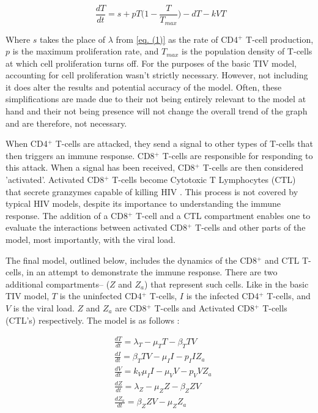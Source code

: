 \documentclass[letterpaper, 11 pt, conference]{ieeeconf}
\begin{document}
\begin{equation}\label{eq. (2)}
    \ \frac{dT}{dt} = s + p T \bigg(1 - \frac{T}{T_{max}}\bigg) - d T - k V T
\end{equation}

Where $s$ takes the place of $\lambda$ from \ref{eq. (1)} as the rate of CD4$^{+}$ T-cell production, $p$ is the maximum proliferation rate, and $T_{max}$ is the population density of T-cells at which cell proliferation turns off. For the purposes of the basic TIV model, accounting for cell proliferation wasn't strictly necessary. However, not including it does alter the results and potential accuracy of the model. Often, these simplifications are made due to their not being entirely relevant to the model at hand and their not being presence will not change the overall trend of the graph and are therefore, not necessary. 

When CD4$^{+}$ T-cells are attacked, they send a signal to other types of T-cells that then triggers an immune response. CD8$^{+}$ T-cells are responsible for responding to this attack. When a signal has been received, CD8$^{+}$ T-cells are then considered 'activated'. Activated CD8$^{+}$ T-cells become Cytotoxic T Lymphocytes (CTL) that secrete granzymes capable of killing HIV \cite{CD8}. This process is not covered by typical HIV models, despite its importance to understanding the immune response. The addition of a CD8$^{+}$ T-cell and a CTL compartment enables one to evaluate the interactions between activated CD8$^{+}$ T-cells and other parts of the model, most importantly, with the viral load. 

The final model, outlined below, includes the dynamics of the CD8$^{+}$ and CTL T-cells, in an attempt to demonstrate the immune response. There are two additional compartments-- ($Z$ and $Z_{a}$) that represent such cells. Like in the basic TIV model, $T$ is the uninfected CD4$^{+}$ T-cells, $I$ is the infected CD4$^{+}$ T-cells, and $V$ is the viral load. $Z$ and $Z_{a}$ are CD8$^{+}$ T-cells and Activated CD8$^{+}$ T-cells (CTL's) respectively. The model is as follows \cite{OCM}:

\begin{equation}\label{eq. (3)}
    \begin{split} 
        &    \frac{dT}{dt} = \lambda_T - \mu_T T - \beta_T T V \\
        &    \frac{dI}{dt} = \beta_T T V - \mu_I I- p_I I Z_a \\
        &    \frac{dV}{dt} = k_V \mu_I I - \mu_V V - p_V V Z_a \\
        &    \frac{dZ}{dt} = \lambda_Z - \mu_Z Z - \beta_Z Z V \\
        &    \frac{dZ_a}{dt} = \beta_Z Z V - \mu_Z Z_a\\
    \end{split}
\end{equation} 
\end{document}
